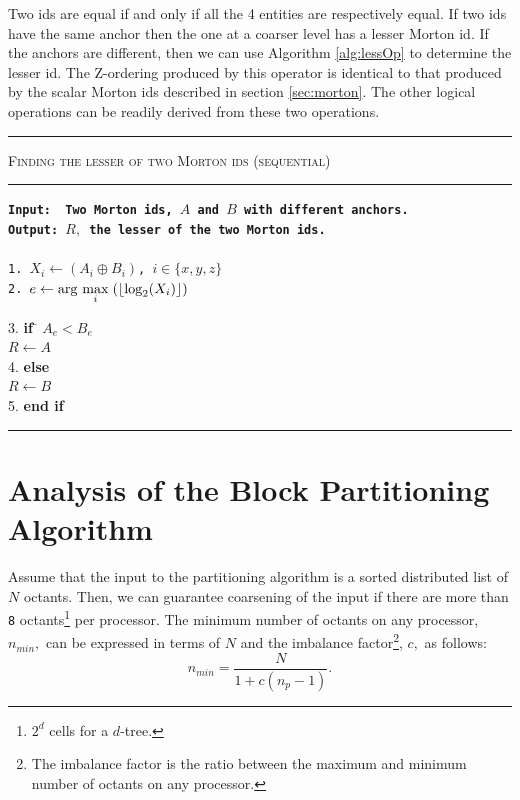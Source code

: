 Two ids are equal if and only if all the 4 entities are respectively
equal. If two ids have the same anchor then the one at a coarser level
has a lesser Morton id. If the anchors are different, then we can use
Algorithm \ref{alg:lessOp} to determine the lesser id. The Z-ordering
produced by this operator is identical to that produced by the scalar
Morton ids described in section \ref{sec:morton}. The other logical
operations can be readily derived from these two operations.


\begin{table}
\centering
\rule{\textwidth}{0.01mm}
\begin{algorithm}{ \textsc{Finding the lesser of two Morton ids (sequential)}}
\rule{\textwidth}{0.01mm}
\flushleft
\tt{\bf{Input:~} Two Morton ids, $A$ and $B$ with different anchors.} \\
\tt{\bf{Output:} $R,$ the lesser of the two Morton ids.}\\
~\\
1. $X_i \leftarrow \left(A_i \oplus B_i\right)$, $i \in \{x, y, z\}$\\
2. $e \leftarrow \arg \,\underset{i}{\max}\; (\lfloor\log_2(X_i)\rfloor)$ \\
\begin{tabbing}
3. {\bf if} \= $A_e < B_e$ \\
           \> $R \leftarrow A$\\
4. {\bf else} \\
             \>  $R \leftarrow B$\\
5. {\bf end if}
\end{tabbing}
\label{alg:lessOp}
\end{algorithm}
\rule{\textwidth}{0.01mm}
\end{table}

\section{Analysis of the Block Partitioning Algorithm}
\label{app:blkPartAnal}
Assume that the input to the partitioning algorithm is a sorted
distributed list of $N$ octants. Then, we can guarantee coarsening of
the input if there are more than {\tt8} octants\footnote{$2^d$ cells
for a $d$-tree.} per processor. The minimum number of octants on any
processor, $n_{min},$ can be expressed in terms of $N$ and the
imbalance factor\footnote{The imbalance factor is the ratio between
the maximum and minimum number of octants on any processor.}, $c,$ as
follows:
\[
n_{min} = \frac{N}{1+c(n_p-1)}.
\]

